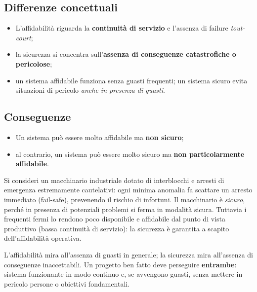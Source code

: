 \subsection{Differenze concettuali}
\begin{itemize}
    \item L'affidabilità riguarda la \textbf{continuità di servizio} e l'assenza di failure \emph{tout-court};
    \item la sicurezza si concentra sull'\textbf{assenza di conseguenze catastrofiche o pericolose};
    \item un sistema affidabile funziona senza guasti frequenti; un sistema sicuro evita situazioni di pericolo \emph{anche in presenza di guasti}.
\end{itemize}

\subsection{Conseguenze}
\begin{itemize}
    \item Un sistema può essere molto affidabile ma \textbf{non sicuro};
    \item al contrario, un sistema può essere molto sicuro ma \textbf{non particolarmente affidabile}.
\end{itemize}

\begin{ex}
Si consideri un macchinario industriale dotato di interblocchi e arresti di emergenza estremamente cautelativi: ogni minima anomalia fa scattare un arresto immediato (fail-safe), prevenendo il rischio di infortuni. Il macchinario è \emph{sicuro}, perché in presenza di potenziali problemi si ferma in modalità sicura. Tuttavia i frequenti fermi lo rendono poco disponibile e affidabile dal punto di vista produttivo (bassa continuità di servizio): la sicurezza è garantita a scapito dell'affidabilità operativa.
\end{ex}

\begin{note}[In sintesi]
L'affidabilità mira all'assenza di guasti in generale; la sicurezza mira all'assenza di conseguenze inaccettabili. Un progetto ben fatto deve perseguire \textbf{entrambe}: sistema funzionante in modo continuo e, se avvengono guasti, senza mettere in pericolo persone o obiettivi fondamentali.
\end{note}


